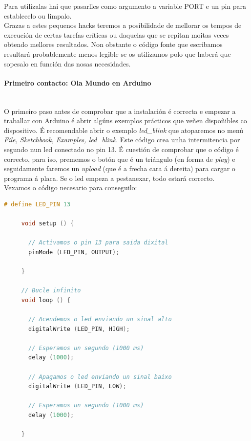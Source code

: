      Para utilizalas hai que pasarlles como argumento a variable PORT e un pin
     para establecelo ou limpalo. \\

     Grazas a estes pequenos hacks teremos a posibilidade de mellorar os tempos
     de execución de certas tarefas críticas ou daquelas que se repitan moitas
     veces obtendo mellores resultados. Non obstante o código fonte que
     escribamos resultará probablemente menos legible se os utilizamos polo que
     haberá que sopesalo en función das nosas necesidades.

    \paragraph{Primeiro contacto: Ola Mundo en Arduino}\mbox{}\\

    O primeiro paso antes de comprobar que a instalación é correcta e empezar a
    traballar con Arduino é abrir algúns exemplos prácticos que veñen
    dispoñibles co dispositivo. É recomendable abrir o exemplo
    \textit{led\_blink} que atoparemos no menú
    \textit{File, Sketchbook, Examples, led\_blink}. Este código crea unha
    intermitencia por segundo nun led conectado no pin 13. É cuestión de
    comprobar que o código é correcto, para iso, prememos o botón que é un
    triángulo (en forma de \textit{play}) e seguidamente faremos un
    \textit{upload} (que é a frecha cara á dereita) para cargar o programa á
    placa. Se o led empeza a pestanexar, todo estará correcto. \\
   
    Vexamos o código necesario para conseguilo: \\

    \begin{lstlisting}[language=C++,frame=single]
     # define LED_PIN 13

     void setup () {

       // Activamos o pin 13 para saida dixital
       pinMode (LED_PIN, OUTPUT);

     }
 
     // Bucle infinito
     void loop () {
 
       // Acendemos o led enviando un sinal alto
       digitalWrite (LED_PIN, HIGH);
 
       // Esperamos un segundo (1000 ms)
       delay (1000);
 
       // Apagamos o led enviando un sinal baixo
       digitalWrite (LED_PIN, LOW);
 
       // Esperamos un segundo (1000 ms)
       delay (1000);
 
     }
   \end{lstlisting}

